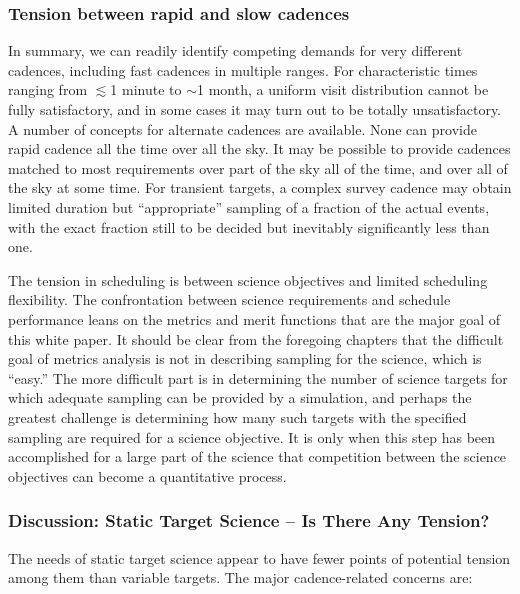 \subsubsection{Tension between rapid and slow cadences}

In summary, we can readily identify competing demands for very different
cadences, including fast cadences in multiple ranges. For characteristic
times ranging from  $\lesssim$1 minute to $\sim$1 month, a uniform visit
distribution cannot be fully satisfactory, and in some cases it may turn
out to be totally unsatisfactory.  A number of concepts for alternate
cadences are available.  None can provide rapid cadence all the time
over all the sky. It may be possible to provide cadences matched to most
requirements over part of the sky all of the time, and over all of the
sky at some time. For transient targets, a complex survey cadence may
obtain limited duration but ``appropriate'' sampling of a fraction of
the actual events, with the exact fraction still to be decided but
inevitably significantly less than one.

The tension in scheduling is between science objectives and limited
scheduling flexibility. The confrontation between science requirements
and schedule performance leans on the metrics and merit functions that
are the major goal of this white paper.  It should be clear from the
foregoing chapters that the difficult goal of metrics analysis is not in
describing sampling for the science, which is ``easy.''  The more
difficult part is in determining the number of science targets for which
adequate sampling can be provided by a simulation, and perhaps the
greatest challenge is determining how many such targets with the
specified sampling are required for a science objective.  It is only
when this step has been accomplished for a large part of the science
that competition between the science objectives can become a
quantitative process.


\subsubsection{Discussion: Static Target Science -- Is There Any Tension?}

The needs of static target science appear to have fewer points of
potential tension among them than variable targets.  The major
cadence-related concerns are:

